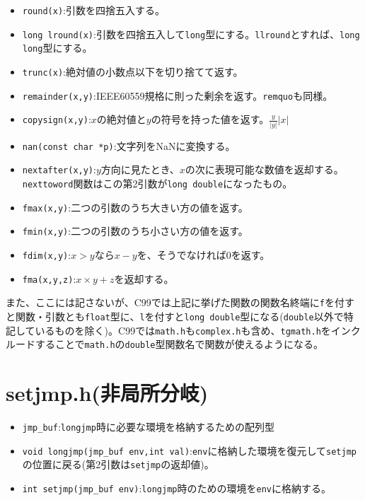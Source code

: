 \begin{itemize}
\item \verb|round(x)|:引数を四捨五入する。
\item \verb|long lround(x)|:引数を四捨五入して\verb|long|型にする。\verb|llround|とすれば、\verb|long long|型にする。
\item \verb|trunc(x)|:絶対値の小数点以下を切り捨てて返す。
\item \verb|remainder(x,y)|:IEEE60559規格に則った剰余を返す。\verb|remquo|も同様。
\item \verb|copysign(x,y)|:$x$の絶対値と$y$の符号を持った値を返す。$\frac{y}{|y|}|x|$
\item \verb|nan(const char *p)|:文字列をNaNに変換する。
\item \verb|nextafter(x,y)|:$y$方向に見たとき、$x$の次に表現可能な数値を返却する。\verb|nexttoword|関数はこの第2引数が\verb|long double|になったもの。
\item \verb|fmax(x,y)|:二つの引数のうち大きい方の値を返す。
\item \verb|fmin(x,y)|:二つの引数のうち小さい方の値を返す。
\item \verb|fdim(x,y)|:$x>y$なら$x-y$を、そうでなければ0を返す。
\item \verb|fma(x,y,z)|:$x\times y+z$を返却する。
\end{itemize}
また、ここには記さないが、C99では上記に挙げた関数の関数名終端に\verb|f|を付すと関数・引数とも\verb|float|型に、\verb|l|を付すと\verb|long double|型になる(\verb|double|以外で特記しているものを除く)。C99では\verb|math.h|も\verb|complex.h|も含め、\verb|tgmath.h|をインクルードすることで\verb|math.h|の\verb|double|型関数名で関数が使えるようになる。

\section{setjmp.h(非局所分岐)}
\begin{itemize}
\item \verb|jmp_buf|:\verb|longjmp|時に必要な環境を格納するための配列型
\item \verb|void longjmp(jmp_buf env,int val)|:\verb|env|に格納した環境を復元して\verb|setjmp|の位置に戻る(第2引数は\verb|setjmp|の返却値)。
\item \verb|int setjmp(jmp_buf env)|:\verb|longjmp|時のための環境を\verb|env|に格納する。
\end{itemize}

